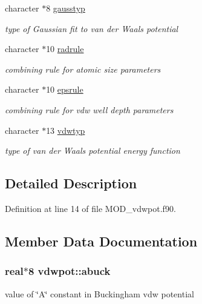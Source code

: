\begin{DoxyCompactItemize}
character $\ast$8 \hyperlink{classvdwpot_addaae4b84133342d8e313d122abd00f0}{gausstyp}
\begin{DoxyCompactList}\small\item\em type of Gaussian fit to van der Waals potential \end{DoxyCompactList}\item 
character $\ast$10 \hyperlink{classvdwpot_a9c63ba4f7b83e74e3064442adcaa8890}{radrule}
\begin{DoxyCompactList}\small\item\em combining rule for atomic size parameters \end{DoxyCompactList}\item 
character $\ast$10 \hyperlink{classvdwpot_ade451daaf049f4de024a0877e12545ce}{epsrule}
\begin{DoxyCompactList}\small\item\em combining rule for vdw well depth parameters \end{DoxyCompactList}\item 
character $\ast$13 \hyperlink{classvdwpot_a932f417f3d7a4ecc44b17bcb3d24b9fb}{vdwtyp}
\begin{DoxyCompactList}\small\item\em type of van der Waals potential energy function \end{DoxyCompactList}\end{DoxyCompactItemize}


\subsection{Detailed Description}


Definition at line 14 of file M\-O\-D\-\_\-vdwpot.\-f90.



\subsection{Member Data Documentation}
\hypertarget{classvdwpot_a325b92aabfa7050cb0c9288d9ef2e1dc}{
\subsubsection[{abuck}]{\setlength{\rightskip}{0pt plus 5cm}real$\ast$8 vdwpot\-::abuck}}\label{classvdwpot_a325b92aabfa7050cb0c9288d9ef2e1dc}


value of \char`\"{}\-A\char`\"{} constant in Buckingham vdw potential 



